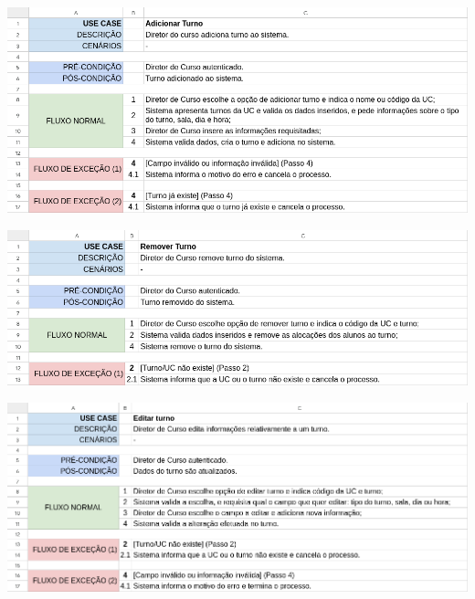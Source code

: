 \documentclass[a4paper,12pt]{scrreprt}
\begin{document}
\begin{minipage}{\textwidth}
    \centering
    \includegraphics[width=1\textwidth]{images/use-cases/descriptions/20-Adicionar turno.png}
    \label{fig:3-20-adicionar_turno}
\end{minipage}

\begin{minipage}{\textwidth}
    \centering
    \includegraphics[width=1\textwidth]{images/use-cases/descriptions/21-Remover turno.png}
    \label{fig:3-21-remover_turno}
\end{minipage}

\begin{minipage}{\textwidth}
    \centering
    \includegraphics[width=1\textwidth]{images/use-cases/descriptions/22-Editar turno.png}
    \label{fig:3-22-editar_turno}
\end{minipage}
\end{document}
